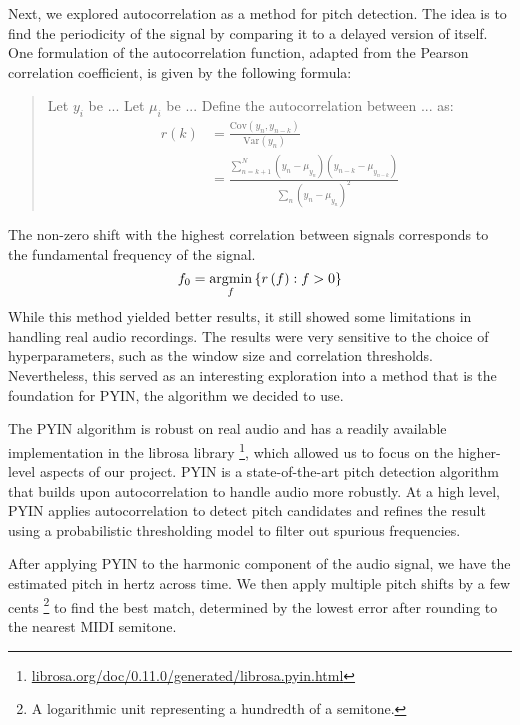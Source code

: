 
Next, we explored autocorrelation as a method for pitch detection. The idea is to find the periodicity of the signal by comparing it to a delayed version of itself. One formulation of the autocorrelation function, adapted from the Pearson correlation coefficient, is given by the following formula:
\begin{quote}
    Let $y_i$ be ... Let $\mu_i$ be ...
    Define the autocorrelation between ... as:
    \begin{align*}
        r\left(k\right)
        &= \frac{\text{Cov}\left(y_n, y_{n-k}\right)}{\text{Var}\left(y_n\right)} \\
        &= \frac{\sum_{n=k+1}^N \left(y_n - \mu_{y_n}\right) \left(y_{n-k} - \mu_{y_{n-k}}\right)}{\sum_n \left(y_n - \mu_{y_n}\right)^2}
    \end{align*}
\end{quote}
The non-zero shift with the highest correlation between signals corresponds to the fundamental frequency of the signal.
$$f_0 = \operatorname*{\arg\!\min}_{f}\left\{ r\left(f\right) : f > 0 \right\}$$
While this method yielded better results, it still showed some limitations in handling real audio recordings. The results were very sensitive to the choice of hyperparameters, such as the window size and correlation thresholds. Nevertheless, this served as an interesting exploration into a method that is the foundation for PYIN, the algorithm we decided to use.


The PYIN algorithm \autocite{PYIN:2014} is robust on real audio and has a readily available implementation in the librosa library \footnote{\href{https://librosa.org/doc/0.11.0/generated/librosa.pyin.html}{librosa.org/doc/0.11.0/generated/librosa.pyin.html}}, which allowed us to focus on the higher-level aspects of our project. PYIN is a state-of-the-art pitch detection algorithm that builds upon autocorrelation to handle audio more robustly. At a high level, PYIN applies autocorrelation to detect pitch candidates and refines the result using a probabilistic thresholding model to filter out spurious frequencies.

After applying PYIN to the harmonic component of the audio signal, we have the estimated pitch in hertz across time. We then apply multiple pitch shifts by a few cents \footnote{A logarithmic unit representing a hundredth of a semitone.} to find the best match, determined by the lowest error after rounding to the nearest MIDI semitone.

